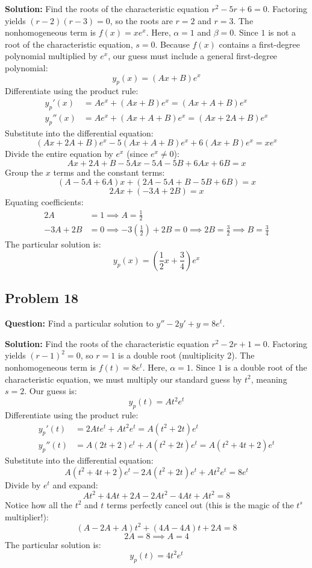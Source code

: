 \documentclass[12pt]{article}
\begin{document}
\textbf{Solution:}
Find the roots of the characteristic equation $r^2 - 5r + 6 = 0$.
Factoring yields $(r-2)(r-3) = 0$, so the roots are $r = 2$ and $r = 3$.
The nonhomogeneous term is $f(x) = x e^x$. Here, $\alpha = 1$ and $\beta = 0$. Since $1$ is not a root of the characteristic equation, $s = 0$.
Because $f(x)$ contains a first-degree polynomial multiplied by $e^x$, our guess must include a general first-degree polynomial:
\[ y_p(x) = (Ax + B)e^x \]
Differentiate using the product rule:
\begin{align*}
    y_p'(x) &= A e^x + (Ax + B)e^x = (Ax + A + B)e^x \\
    y_p''(x) &= A e^x + (Ax + A + B)e^x = (Ax + 2A + B)e^x
\end{align*}
Substitute into the differential equation:
\[ (Ax + 2A + B)e^x - 5(Ax + A + B)e^x + 6(Ax + B)e^x = x e^x \]
Divide the entire equation by $e^x$ (since $e^x \neq 0$):
\[ Ax + 2A + B - 5Ax - 5A - 5B + 6Ax + 6B = x \]
Group the $x$ terms and the constant terms:
\[ (A - 5A + 6A)x + (2A - 5A + B - 5B + 6B) = x \]
\[ 2Ax + (-3A + 2B) = x \]
Equating coefficients:
\begin{align*}
    2A &= 1 \implies A = \frac{1}{2} \\
    -3A + 2B &= 0 \implies -3\left(\frac{1}{2}\right) + 2B = 0 \implies 2B = \frac{3}{2} \implies B = \frac{3}{4}
\end{align*}
The particular solution is:
\[ y_p(x) = \left(\frac{1}{2}x + \frac{3}{4}\right)e^x \]

\subsection{Problem 18}
\textbf{Question:} Find a particular solution to $y'' - 2y' + y = 8e^t$.

\textbf{Solution:}
Find the roots of the characteristic equation $r^2 - 2r + 1 = 0$.
Factoring yields $(r-1)^2 = 0$, so $r = 1$ is a double root (multiplicity 2).
The nonhomogeneous term is $f(t) = 8e^t$. Here, $\alpha = 1$. Since $1$ is a double root of the characteristic equation, we must multiply our standard guess by $t^2$, meaning $s = 2$.
Our guess is:
\[ y_p(t) = A t^2 e^t \]
Differentiate using the product rule:
\begin{align*}
    y_p'(t) &= 2At e^t + A t^2 e^t = A(t^2 + 2t)e^t \\
    y_p''(t) &= A(2t + 2)e^t + A(t^2 + 2t)e^t = A(t^2 + 4t + 2)e^t
\end{align*}
Substitute into the differential equation:
\[ A(t^2 + 4t + 2)e^t - 2A(t^2 + 2t)e^t + A t^2 e^t = 8e^t \]
Divide by $e^t$ and expand:
\[ A t^2 + 4At + 2A - 2A t^2 - 4At + A t^2 = 8 \]
Notice how all the $t^2$ and $t$ terms perfectly cancel out (this is the magic of the $t^s$ multiplier!):
\[ (A - 2A + A)t^2 + (4A - 4A)t + 2A = 8 \]
\[ 2A = 8 \implies A = 4 \]
The particular solution is:
\[ y_p(t) = 4t^2 e^t \]
\end{document}
